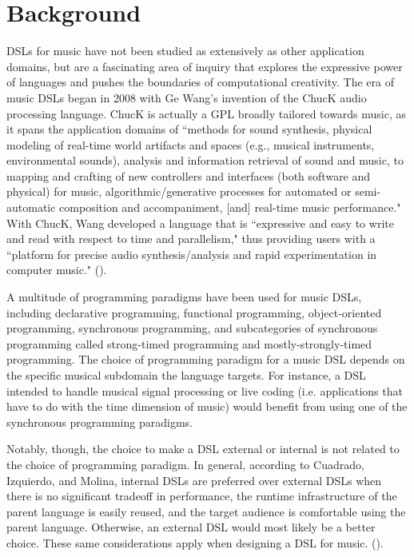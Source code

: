 \documentclass{report}
\newcommand\citeparen[1]{(\cite{#1})}
\begin{document}
\chapter{Background}
\label{chap:background}

DSLs for music have not been studied as extensively as other application domains, but are a fascinating area of inquiry that explores the expressive power of languages and pushes the boundaries of computational creativity. The era of music DSLs began in 2008  with Ge Wang's invention of the ChucK audio processing language. ChucK is actually a GPL broadly tailored towards music, as it spans the application domains of ``methods for sound synthesis, physical modeling of real-time world artifacts and spaces (e.g.,
musical instruments, environmental sounds), analysis and information retrieval of sound and music, to mapping and crafting of new controllers and interfaces (both software and physical) for music, algorithmic/generative processes for automated or semi-automatic composition and accompaniment, [and] real-time music performance." With ChucK, Wang developed a language that is ``expressive and easy to write and read with respect to time and parallelism," thus providing users with a ``platform for precise audio synthesis/analysis and rapid experimentation in computer music." \citeparen{wang_2008}. 

A multitude of programming paradigms have been used for music DSLs, including declarative programming, functional programming, object-oriented programming, synchronous programming, and subcategories of synchronous programming called strong-timed programming and mostly-strongly-timed programming. The choice of programming paradigm for a music DSL depends on the specific musical subdomain the language targets. For instance, a DSL intended to handle musical signal processing or live coding (i.e. applications that have to do with the time dimension of music) would benefit from using one of the synchronous programming paradigms. 

Notably, though, the choice to make a DSL external or internal is not related to the choice of programming paradigm. In general, according to Cuadrado, Izquierdo, and Molina, internal DSLs are preferred over external DSLs when there  is  no significant tradeoff in performance, the runtime infrastructure of the parent language is easily reused, and the target audience is comfortable using  the parent language. Otherwise, an external DSL would most likely be a better choice. These same considerations apply when designing a DSL for music.
\citeparen{cuadrado_izquierdo_molina_2012}.
\end{document}
